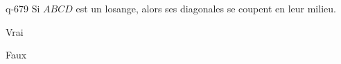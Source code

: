 \begin{truefalse}{q-679}
Si $ABCD$ est un losange, alors ses diagonales se coupent en leur milieu.
\item* Vrai
\item Faux
\end{truefalse}

